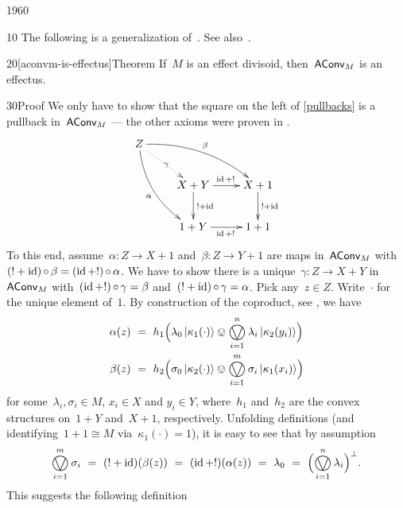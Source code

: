 \begin{parsec}{1960}%
\begin{point}{10}%
The following is a generalization
of~\cite[Prop.~C.3]{kentapartial}.
See also~\cite[Prop.~15]{statesofconvexsets}.
\end{point}
\begin{point}{20}[aconvm-is-effectus]{Theorem}%
If~$M$ is an effect divisoid,
    then~$\mathsf{AConv}_M$ is an effectus.
\begin{point}{30}{Proof}%
We only have to show that the square on the left
    of \eqref{pullbacks} is a pullback in~$\mathsf{AConv}_M$
    --- the other axioms were proven in .
\begin{equation*}
\xymatrix{
    Z \ar@/^1pc/[rrd]^\beta
        \ar@/_1pc/[rdd]_\alpha
        \ar@{.>}[rd]|\gamma\\
        &X+Y \ar[r]^{\id+!} \ar[d]^{!+\id} & X+1\ar[d]^{!+\id} \\
        &1+Y\ar[r]_{\id+!} & 1+1
    }
\end{equation*}
To this end, assume~$\alpha\colon Z \to X+1$
and~$\beta\colon Z \to Y+1$
are maps in~$\mathsf{AConv}_M$
with~$(! + \operatorname{id}) \mathop{\circ} \beta = (\operatorname{id}+!)\mathop{\circ} \alpha$.
We have to show there is a unique~$\gamma\colon Z \to X+Y$ in~$\mathsf{AConv}_M$
with~$(\operatorname{id}+!)\mathop{\circ} \gamma =\beta$
and~$(!+\operatorname{id}) \mathop{\circ} \gamma =\alpha$.
Pick any~$z \in Z$.
Write~$\cdot$ for the unique element of~$1$.
By construction of the coproduct, see ,
we have
\begin{align*}
    \alpha(z) &\ =\  h_1\Bigl(\lambda_0 \ket{\kappa_1(\cdot)}
    \ovee \bigovee^n_{i=1} \lambda_i \ket{\kappa_2(y_i)}\Bigr) \\
        \beta(z) &\ =\  h_2 \Bigl(\sigma_0 \ket{\kappa_2(\cdot)}
        \ovee \bigovee^m_{i=1} \sigma_i \ket{\kappa_1(x_i)}\Bigr)
\end{align*}
for some~$\lambda_i, \sigma_i \in M$,
    $x_i \in X$ and $y_i \in Y$,
    where~$h_1$ and~$h_2$ are the convex structures
    on~$1+Y$ and~$X+1$, respectively.
Unfolding definitions
    (and identifying~$1+1 \cong M$ via~$\kappa_1 (\cdot) = 1$),
    it is easy to
    see that by assumption
\begin{equation}\label{aconv-epb-ass}
    \bigovee^m_{i=1} \sigma_i \ = \ 
    (!+\id)(\beta(z))  \ = \ 
    (\id + !)(\alpha(z)) \ =\  \lambda_0
    \ = \ \Bigl(\bigovee^n_{i=1} \lambda_i\Bigr)^\perp.
\end{equation}
This suggests the following definition
\begin{equation}\label{aconvmexpuldefgamma}

\end{equation}
\end{point}
\end{point}
\end{parsec}
